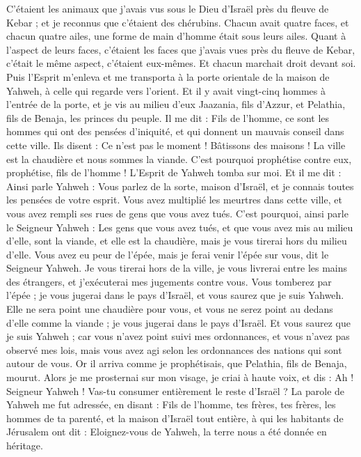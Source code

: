 \begin{multicols}{2}
C’étaient les animaux que j'avais vus sous le Dieu d'Israël près du fleuve de Kebar ; et je reconnus que c'étaient des chérubins.
Chacun avait quatre faces, et chacun quatre ailes, une forme de main d'homme était sous leurs ailes.
Quant à l’aspect de leurs faces, c'étaient les faces que j'avais vues près du fleuve de Kebar, c’était le même aspect, c’étaient eux-mêmes. Et chacun marchait droit devant soi.
\VerseOne{}Puis l'Esprit m'enleva et me transporta à la porte orientale de la maison de Yahweh, à celle qui regarde vers l'orient. Et il y avait vingt-cinq hommes à l'entrée de la porte, et je vis au milieu d'eux Jaazania, fils d’Azzur, et Pelathia, fils de Benaja, les princes du peuple.
Il me dit : Fils de l’homme, ce sont les hommes qui ont des pensées d'iniquité, et qui donnent un mauvais conseil dans cette ville\FTNT{}.
Ils disent : Ce n'est pas le moment ! Bâtissons des maisons ! La ville est la chaudière et nous sommes la viande.
C'est pourquoi prophétise contre eux, prophétise, fils de l’homme !
L'Esprit de Yahweh tomba sur moi. Et il me dit : Ainsi parle Yahweh : Vous parlez de la sorte, maison d'Israël, et je connais toutes les pensées de votre esprit.
Vous avez multiplié les meurtres dans cette ville, et vous avez rempli ses rues de gens que vous avez tués.
C'est pourquoi, ainsi parle le Seigneur Yahweh : Les gens que vous avez tués, et que vous avez mis au milieu d'elle, sont la viande, et elle est la chaudière, mais je vous tirerai hors du milieu d'elle\FTNT{}.
Vous avez eu peur de l'épée, mais je ferai venir l'épée sur vous, dit le Seigneur Yahweh\FTNT{}.
Je vous tirerai hors de la ville, je vous livrerai entre les mains des étrangers, et j'exécuterai mes jugements contre vous.
Vous tomberez par l'épée ; je vous jugerai dans le pays d'Israël, et vous saurez que je suis Yahweh.
Elle ne sera point une chaudière pour vous, et vous ne serez point au dedans d'elle comme la viande ; je vous jugerai dans le pays d'Israël.
Et vous saurez que je suis Yahweh ; car vous n'avez point suivi mes ordonnances, et vous n'avez pas observé mes lois, mais vous avez agi selon les ordonnances des nations qui sont autour de vous.
Or il arriva comme je prophétisais, que Pelathia, fils de Benaja, mourut.  Alors je me prosternai sur mon visage, je criai à haute voix, et dis : Ah ! Seigneur Yahweh ! Vas-tu consumer entièrement le reste d'Israël ?
La parole de Yahweh me fut adressée, en disant :
Fils de l’homme, tes frères, tes frères, les hommes de ta parenté, et la maison d'Israël tout entière, à qui les habitants de Jérusalem ont dit : Eloignez-vous de Yahweh, la terre nous a été donnée en héritage.

\end{multicols}
